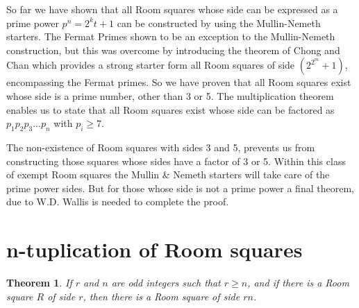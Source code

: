 \documentclass[
  11pt,
  a4paper]{book}
\newtheorem{theorem}{Theorem}
\begin{document}
So far we have shown that all Room squares whose side can be
expressed as a prime power \(p^n = 2^kt + 1\) can be constructed
by using the Mullin-Nemeth starters. The Fermat Primes shown
to be an exception to the Mullin-Nemeth construction, but
this was overcome by introducing the theorem of Chong and
Chan which provides a strong starter form all Room squares
of side \((2^{2^m} + 1)\), encompassing the Fermat primes. So we
have proven that all Room squares exist whose side is a
prime number, other than 3 or 5. The multiplication theorem
enables us to state that all Room squares exist whose side
can be factored as \(p_1p_2p_3...p_n\) with \(p_i \geq 7\).

The non-existence of Room squares with sides 3 and 5,
prevents us from constructing those squares whose sides have
a factor of 3 or 5. Within this class of exempt Room squares
the Mullin \& Nemeth starters will take care of the prime
power sides. But for those whose side is not a prime power a
final theorem, due to W.D. Wallis is needed to complete the
proof.

\hypertarget{n-tuplication-of-room-squares}{%
\section{n-tuplication of Room squares}\label{n-tuplication-of-room-squares}}

\begin{theorem}
If $r$ and $n$ are odd integers such that $r \geq n$, and if
there is a Room square $R$ of side $r$, then there is a Room
square of side $rn$.
\end{theorem}
\end{document}
